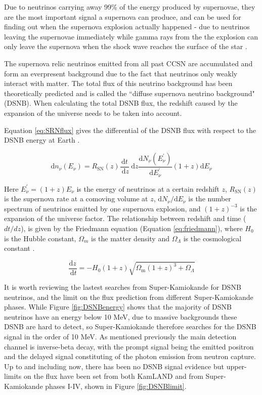 Due to neutrinos carrying away 99\% of the energy produced by supernovae, they are the most important signal a supernova can produce, and can be used for finding out when the supernova explosion actually happened - due to neutrinos leaving the supernovae immediately while gamma rays from the the explosion can only leave the supernova when the shock wave reaches the surface of the star \cite{bethe_supernova_1990}.

The supernova relic neutrinos emitted from all past CCSN are accumulated and form an everpresent background due to the fact that neutrinos only weakly interact with matter. The total flux of this neutrino background has been theoretically predicted and is called the ``diffuse supernova neutrino background" (DSNB). When calculating the total DSNB flux, the redshift caused by the expansion of the universe needs to be taken into account.

Equation \ref{eq:SRNflux} gives the differential of the DSNB flux with respect to the DSNB energy at Earth \cite{beacom2010diffuse}.

\begin{equation}
\mathrm{d} n_{\nu}\left(E_{\nu}\right)=R_{\mathrm{SN}}(z) \frac{\mathrm{d} t}{\mathrm{~d} z} \mathrm{~d} z \frac{\mathrm{d} N_{\nu}\left(E_{\nu}^{\prime}\right)}{\mathrm{d} E_{\nu}^{\prime}}(1+z) \mathrm{d} E_{\nu}
\label{eq:SRNflux}
\end{equation}

Here $E_{\nu}^{\prime}=(1+z) E_{\nu}$ is the energy of neutrinos at a certain redshift $z$, $R_{\mathrm{SN}}(z)$ is the supernova rate at a comoving volume at $z$, $\mathrm{d} N_{\nu} / \mathrm{d} E_{\nu}$ is the number spectrum of neutrinos emitted by one supernova explosion, and $(1+z)^{-3}$ is the expansion of the universe factor. The relationship between redshift and time ($dt/dz$), is given by the Friedmann equation (Equation \ref{eq:friedmann}), where $H_{0}$ is the Hubble constant, $\Omega_{m}$ is the matter density and $\Omega_{\Lambda}$ is the cosmological constant \cite{ando_relic_2004}.

\begin{equation}
\frac{\mathrm{d} z}{\mathrm{~d} t}=-H_{0}(1+z) \sqrt{\Omega_{\mathrm{m}}(1+z)^{3}+\Omega_{\Lambda}}
\label{eq:friedmann}
\end{equation}

It is worth reviewing the lastest searches from Super-Kamiokande for DSNB neutrinos, and the limit on the flux prediction from different Super-Kamiokande phases. While Figure \ref{fig:DSNBenergy} shows that the majority of DSNB neutrinos have an energy below 10 MeV, due to massive backgrounds these DSNB are hard to detect, so Super-Kamiokande therefore searches for the DSNB signal in the order of 10 MeV. As mentioned previously the main detection channel is inverse-beta decay, with the prompt signal being the emitted positron and the delayed signal constituting of the photon emission from neutron capture. Up to and including now, there has been no DSNB signal evidence but upper-limits on the flux have been set from both KamLAND and from Super-Kamiokande phases I-IV, shown in Figure \ref{fig:DSNBlimit}.


